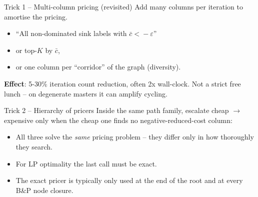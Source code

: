 \documentclass[10pt,aspectratio=169]{beamer}
\newcommand{\redcost}{\bar{c}}
\begin{document}
\begin{frame}{Trick 1 -- Multi-column pricing (revisited)}
  Add many columns per iteration to amortise the pricing.
  \begin{itemize}\small
    \item ``All non-dominated sink labels with $\redcost\!<\!-\varepsilon$''
    \item or top-$K$ by $\redcost$,
    \item or one column per ``corridor'' of the graph (diversity).
  \end{itemize}

  \medskip
  \textbf{Effect}: 5-30\% iteration count reduction, often 2x wall-clock.
  Not a strict free lunch -- on degenerate masters it can amplify cycling.
\end{frame}

\begin{frame}{Trick 2 -- Hierarchy of pricers}
  Inside the same path family, escalate cheap $\to$ expensive only when the
  cheap one finds no negative-reduced-cost column:
  \begin{center}
  \end{center}
  \vspace{-0.3em}
  \begin{itemize}\small
    \item All three solve the \emph{same} pricing problem -- they differ only
          in how thoroughly they search.
    \item For LP optimality the \alert{last} call must be exact.
    \item The exact pricer is typically only used at the end of the root
          and at every B\&P node closure.
  \end{itemize}
\end{frame}
\end{document}
